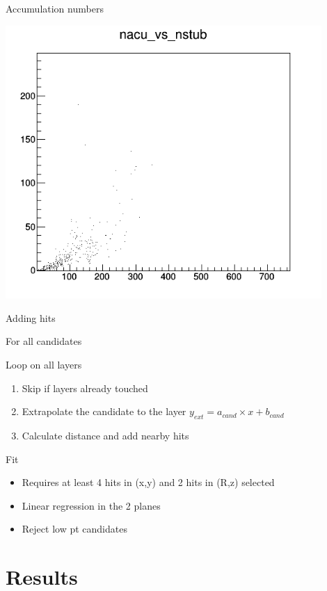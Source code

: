 \documentclass[10pt]{beamer}
\begin{document}
\begin{frame}{Accumulation numbers}
	\centerline{\includegraphics[width=0.9\textwidth,height=0.9\textheight]{nacu_vs_nstub.png}}
\end{frame}
\begin{frame}{Adding hits}

For all candidates
\begin{block}{ Loop on all layers}
  \begin{enumerate}
    \item Skip if layers already touched
    \item Extrapolate the candidate to the layer $ y_{ext} = a_{cand} \times x + b_{cand} $ 
    \item Calculate distance and add nearby hits
  \end{enumerate}
\end{block}
\pause 
\begin{block}{ Fit}
  \begin{itemize}
    \item Requires at least 4 hits in (x,y) and 2 hits in (R,z) selected
    \item Linear regression in the 2 planes
    \item Reject low pt candidates
  \end{itemize}
\end{block}

\end{frame}
\section{Results}
\end{document}
